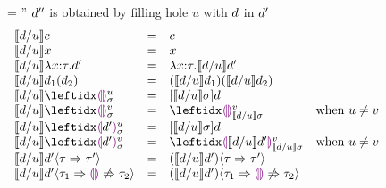 
\begin{figure}[t]
\judgbox
  { = \dexp''}
  {$d''$ is obtained by filling hole $u$ with $d$ in $d'$}
\[
\begin{array}{lcll}
\instantiate{\dexp}{u}{c}
&=&
c\\
{\instantiate{\dexp}{u}{x}}
&=&
x\\
{\instantiate{\dexp}{u}{\halam{x}{\htau}{\dexp'}}}
&=&
{\halam{x}{\htau}{\instantiate{\dexp}{u}{\dexp'}}}\\
{\instantiate{\dexp}{u}{\dap{d_1}{d_2}}}
&=&
{\dapP{\instantiate{\dexp}{u}{d_1}}{\instantiate{\dexp}{u}{d_2}}}
\\
\instantiate{\dexp}{u}{\dehole{u}{\subst}{}}
&=&
[\instantiate{\dexp}{u}{\subst}]\dexp
\\
\instantiate{\dexp}{u}{\dehole{v}{\subst}{}}
&=&
\dehole{v}{\instantiate{\dexp}{u}{\subst}}{}
& \text{when $u \neq v$}
\\
\instantiate{\dexp}{u}{\dhole{\dexp'}{u}{\subst}{}}
&=&
[\instantiate{\dexp}{u}{\subst}]\dexp
\\
\instantiate{\dexp}{u}{\dhole{\dexp'}{v}{\subst}{}}
&=&
\dhole{\instantiate{\dexp}{u}{\dexp'}}{v}{\instantiate{\dexp}{u}{\subst}}{}
& \text{when $u \neq v$}
\\
\instantiate{\dexp}{u}{\dcasttwo{\dexp'}{\htau}{\htau'}}
&=&
\dcasttwo{(\instantiate{\dexp}{u}{\dexp'})}{\htau}{\htau'}
\\
\instantiate{\dexp}{u}{\dcastfail{\dexp'}{\htau_1}{\htau_2}}
&=&
\dcastfail{(\instantiate{\dexp}{u}{\dexp'})}{\htau_1}{\htau_2}
\end{array}
\]
\end{figure}
